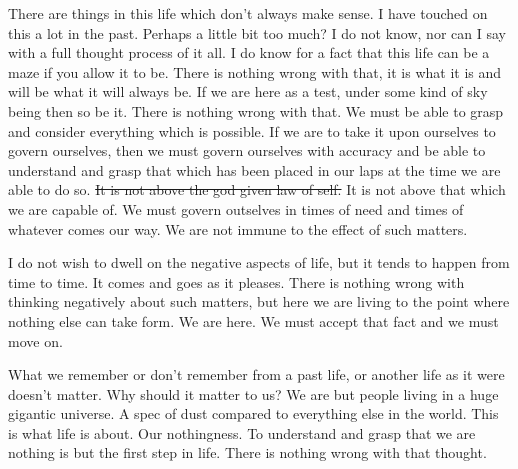 There are things in this life which don't always make sense. I have touched on
this a lot in the past. Perhaps a little bit too much? I do not know, nor can
I say with a full thought process of it all. I do know for a fact that this life
can be a maze if you allow it to be. There is nothing wrong with that, it is
what it is and will be what it will always be. If we are here as a test, under
some kind of sky being then so be it. There is nothing wrong with that. We must
be able to grasp and consider everything which is possible. If we are to take it
upon ourselves to govern ourselves, then we must govern ourselves with accuracy
and be able to understand and grasp that which has been placed in our laps at
the time we are able to do so. \st{It is not above the god given law of self.}
It is not above that which we are capable of. We must govern outselves in times
of need and times of whatever comes our way. We are not immune to the effect of
such matters.

I do not wish to dwell on the negative aspects of life, but it tends to happen
from time to time. It comes and goes as it pleases. There is nothing wrong with
thinking negatively about such matters, but here we are living to the point
where nothing else can take form. We are here. We must accept that fact and we
must move on.

What we remember or don't remember from a past life, or another life as it were
doesn't matter. Why should it matter to us? We are but people living in a huge
gigantic universe. A spec of dust compared to everything else in the world. This
is what life is about. Our nothingness. To understand and grasp that we are
nothing is but the first step in life. There is nothing wrong with that thought.
